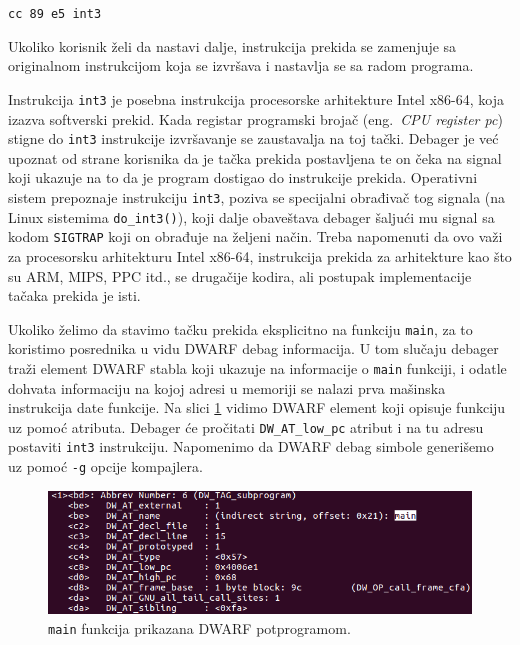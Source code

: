 \documentclass[12pt,oneside]{memoir}
\begin{document}
\texttt{cc 89 e5  int3}

Ukoliko korisnik želi da nastavi dalje, instrukcija prekida se zamenjuje sa originalnom instrukcijom koja se izvršava i nastavlja se sa radom programa.

Instrukcija \texttt{int3} je posebna instrukcija procesorske arhitekture Intel x86-64, koja izazva softverski prekid. Kada registar programski brojač (eng.~\emph{CPU register pc}) stigne do \texttt{int3} instrukcije izvršavanje se zaustavalja na toj tački. Debager je već upoznat od strane korisnika da je tačka prekida postavljena te on čeka na signal koji ukazuje na to da je program dostigao do instrukcije prekida. Operativni sistem prepoznaje instrukciju \texttt{int3}, poziva se specijalni obrađivač tog signala (na Linux sistemima \texttt{do\_int3()}), koji dalje obaveštava debager šaljući mu signal sa kodom \texttt{SIGTRAP} koji on obrađuje na željeni način. Treba napomenuti da ovo važi za procesorsku arhitekturu Intel x86-64, instrukcija prekida za arhitekture kao što su ARM, MIPS, PPC itd., se drugačije kodira, ali postupak implementacije tačaka prekida je isti.

Ukoliko želimo da stavimo tačku prekida eksplicitno na funkciju \texttt{main}, za to koristimo posrednika u vidu DWARF debag informacija. U tom slučaju debager traži element DWARF stabla koji ukazuje na informacije o \texttt{main} funkciji, i odatle dohvata informaciju na kojoj adresi u memoriji se nalazi prva mašinska instrukcija date funkcije. Na slici \ref{fig:mainsub} vidimo DWARF element koji opisuje funkciju uz pomoć atributa. Debager će pročitati \texttt{DW\_AT\_low\_pc} atribut i na tu adresu postaviti \texttt{int3} instrukciju. Napomenimo da DWARF debag simbole generišemo uz pomoć \texttt{-g} opcije kompajlera.

\begin{figure}[h!]
	\begin{center}
		\includegraphics[scale=0.4]{slike/main_subprogram.png}
	\end{center}
	\caption{\texttt{main} funkcija prikazana DWARF potprogramom.}
	\label{fig:mainsub}
\end{figure}
\end{document}
